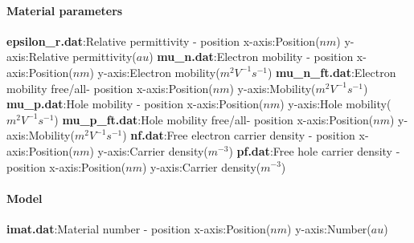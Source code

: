 \paragraph{Material parameters}
\textbf{epsilon\_r.dat}:Relative permittivity - position\newline
x-axis:Position($nm$)\newline
y-axis:Relative permittivity($au$)\newline
\newline
\textbf{mu\_n.dat}:Electron mobility - position\newline
x-axis:Position($nm$)\newline
y-axis:Electron mobility($m^{2} V^{-1} s^{-1}$)\newline
\newline
\textbf{mu\_n\_ft.dat}:Electron mobility free/all- position\newline
x-axis:Position($nm$)\newline
y-axis:Mobility($m^{2} V^{-1} s^{-1}$)\newline
\newline
\textbf{mu\_p.dat}:Hole mobility - position\newline
x-axis:Position($nm$)\newline
y-axis:Hole mobility($m^{2} V^{-1} s^{-1}$)\newline
\newline
\textbf{mu\_p\_ft.dat}:Hole mobility free/all- position\newline
x-axis:Position($nm$)\newline
y-axis:Mobility($m^{2} V^{-1} s^{-1}$)\newline
\newline
\textbf{nf.dat}:Free electron carrier density - position\newline
x-axis:Position($nm$)\newline
y-axis:Carrier density($m^{-3}$)\newline
\newline
\textbf{pf.dat}:Free hole carrier density - position\newline
x-axis:Position($nm$)\newline
y-axis:Carrier density($m^{-3}$)\newline
\newline
\paragraph{Model}
\textbf{imat.dat}:Material number - position\newline
x-axis:Position($nm$)\newline
y-axis:Number($au$)\newline
\newline
